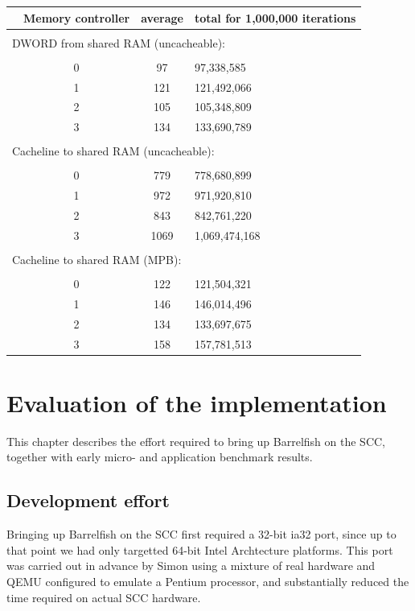 \documentclass[a4paper,twoside]{report} %
\begin{document}
\begin{center}
\begin{tabular}{cccl}
\hspace{3em} & Memory controller & average & total for 1,000,000 iterations \\
\hline \\
\multicolumn{4}{l}{DWORD from shared RAM (uncacheable):} \\
\\
 & 0 & 97  & 97,338,585 \\
 & 1 & 121 & 121,492,066 \\
 & 2 & 105 & 105,348,809 \\
 & 3 & 134 & 133,690,789 \\
\\
\multicolumn{4}{l}{Cacheline to shared RAM (uncacheable):} \\
\\
 & 0 & 779 & 778,680,899 \\
 & 1 & 972 & 971,920,810 \\
 & 2 & 843 & 842,761,220 \\
 & 3 & 1069 & 1,069,474,168 \\
\\
\multicolumn{4}{l}{Cacheline to shared RAM (MPB):} \\
\\
 & 0 & 122 & 121,504,321 \\
 & 1 & 146 & 146,014,496 \\
 & 2 & 134 & 133,697,675 \\
 & 3 & 158 & 157,781,513 \\
\end{tabular}
\end{center}


\chapter{Evaluation of the implementation}\label{chap:eval}

This chapter describes the effort required to bring up Barrelfish on
the SCC, together with early micro- and application benchmark
results. 

\section{Development effort}

Bringing up Barrelfish on the SCC first required a 32-bit ia32 port,
since up to that point we had only targetted 64-bit Intel Archtecture
platforms.  This port was carried out in advance by Simon using a
mixture of real hardware and QEMU configured to emulate a Pentium
processor, and substantially reduced the time required on actual SCC
hardware. 
\end{document}
